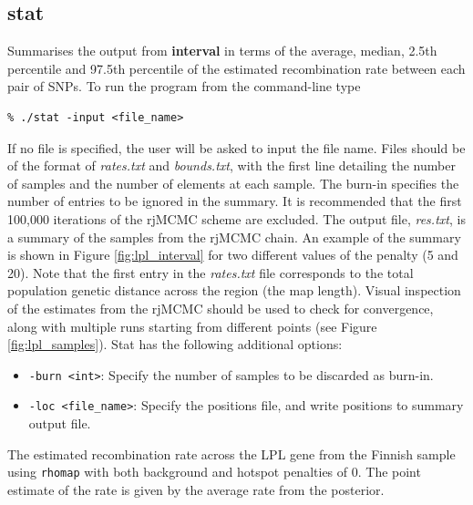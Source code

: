 \documentclass[a4paper,10pt,fullpage]{article}
\begin{document}
\subsection{stat}

Summarises the output from {\bf interval} in terms of the average,
median, 2.5th percentile and 97.5th percentile of the estimated
recombination rate between each pair of SNPs.  To run the program
from the command-line type\\
\begin{verbatim}
% ./stat -input <file_name>
\end{verbatim}
If no file is specified, the user will be asked to input the file
name.  Files should be of the format of {\it rates.txt} and {\it
bounds.txt}, with the first line detailing the number of samples
and the number of elements at each sample.  The burn-in specifies
the number of entries to be ignored in the summary.  It is
recommended that the first 100,000 iterations of the rjMCMC scheme
are excluded.  The output file, {\it res.txt}, is a summary of the
samples from the rjMCMC chain. An example of the summary is shown
in Figure \ref{fig:lpl_interval} for two different values of the
penalty (5 and 20). Note that the first entry in the {\it
rates.txt} file corresponds to the total population genetic
distance across the region (the map length).  Visual inspection of
the estimates from the rjMCMC should be used to check for
convergence, along with multiple runs starting from different
points (see Figure \ref{fig:lpl_samples}).  Stat has the following additional options:

\begin{itemize}
\item \verb+-burn <int>+: Specify the number of samples to be discarded as burn-in.
\item \verb+-loc <file_name>+: Specify the positions file, and write positions to summary output file.
\end{itemize}

The estimated recombination rate across the LPL gene from
the Finnish sample using {\verb+rhomap+} with both background and hotspot penalties of 0. The
point estimate of the rate is given by the average rate from the posterior.
\end{document}
